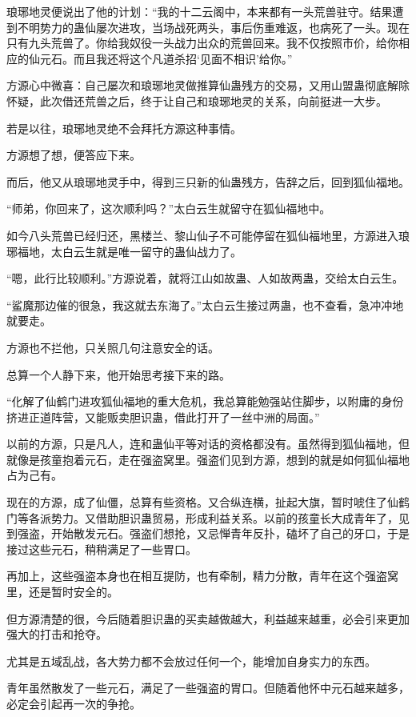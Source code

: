 \begin{this_body}
琅琊地灵便说出了他的计划：“我的十二云阁中，本来都有一头荒兽驻守。结果遭到不明势力的蛊仙屡次进攻，当场战死两头，事后伤重难返，也病死了一头。现在只有九头荒兽了。你给我奴役一头战力出众的荒兽回来。我不仅按照市价，给你相应的仙元石。而且我还将这个凡道杀招‘见面不相识’给你。”

方源心中微喜：自己屡次和琅琊地灵做推算仙蛊残方的交易，又用山盟蛊彻底解除怀疑，此次借还荒兽之后，终于让自己和琅琊地灵的关系，向前挺进一大步。

若是以往，琅琊地灵绝不会拜托方源这种事情。

方源想了想，便答应下来。

而后，他又从琅琊地灵手中，得到三只新的仙蛊残方，告辞之后，回到狐仙福地。

“师弟，你回来了，这次顺利吗？”太白云生就留守在狐仙福地中。

如今八头荒兽已经归还，黑楼兰、黎山仙子不可能停留在狐仙福地里，方源进入琅琊福地，太白云生就是唯一留守的蛊仙战力了。

“嗯，此行比较顺利。”方源说着，就将江山如故蛊、人如故两蛊，交给太白云生。

“鲨魔那边催的很急，我这就去东海了。”太白云生接过两蛊，也不查看，急冲冲地就要走。

方源也不拦他，只关照几句注意安全的话。

总算一个人静下来，他开始思考接下来的路。

“化解了仙鹤门进攻狐仙福地的重大危机，我总算能勉强站住脚步，以附庸的身份挤进正道阵营，又能贩卖胆识蛊，借此打开了一丝中洲的局面。”

以前的方源，只是凡人，连和蛊仙平等对话的资格都没有。虽然得到狐仙福地，但就像是孩童抱着元石，走在强盗窝里。强盗们见到方源，想到的就是如何狐仙福地占为己有。

现在的方源，成了仙僵，总算有些资格。又合纵连横，扯起大旗，暂时唬住了仙鹤门等各派势力。又借助胆识蛊贸易，形成利益关系。以前的孩童长大成青年了，见到强盗，开始散发元石。强盗们想抢，又忌惮青年反扑，磕坏了自己的牙口，于是接过这些元石，稍稍满足了一些胃口。

再加上，这些强盗本身也在相互提防，也有牵制，精力分散，青年在这个强盗窝里，还是暂时安全的。

但方源清楚的很，今后随着胆识蛊的买卖越做越大，利益越来越重，必会引来更加强大的打击和抢夺。

尤其是五域乱战，各大势力都不会放过任何一个，能增加自身实力的东西。

青年虽然散发了一些元石，满足了一些强盗的胃口。但随着他怀中元石越来越多，必定会引起再一次的争抢。


\end{this_body}
